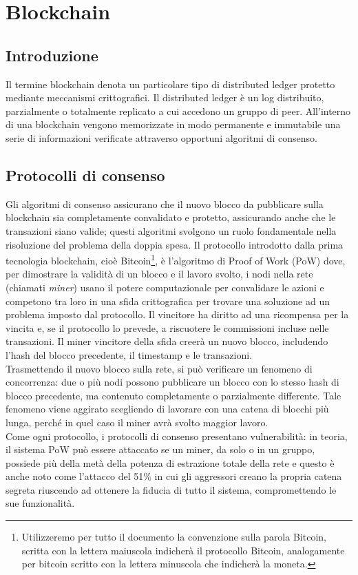 \chapter{Blockchain}
\label{chap:blockchain}

\section{Introduzione}
\label{sec:introduzione}

Il termine blockchain denota un particolare tipo di distributed ledger protetto mediante meccanismi crittografici.
Il distributed ledger è un log distribuito, parzialmente o totalmente replicato a cui accedono un gruppo di peer.
All’interno di una blockchain vengono memorizzate in modo permanente e immutabile una serie di informazioni verificate attraverso opportuni algoritmi di consenso.


\section{Protocolli di consenso}
\label{sec:protocolloDiConsenso}

Gli algoritmi di consenso assicurano che il nuovo blocco da pubblicare sulla blockchain sia completamente convalidato e protetto, assicurando anche che le transazioni siano valide; questi algoritmi svolgono un ruolo fondamentale nella risoluzione del problema della doppia spesa.
Il protocollo introdotto dalla prima tecnologia blockchain, cioè Bitcoin\footnote{Utilizzeremo per tutto il documento la convenzione sulla parola Bitcoin, scritta con la lettera maiuscola indicherà il protocollo Bitcoin, analogamente per bitcoin scritto con la lettera minuscola che indicherà la moneta.}, è l’algoritmo di  Proof of Work (PoW) dove, per dimostrare la validità di un blocco e il lavoro svolto, i nodi nella rete (chiamati {\it miner\/}) usano il potere computazionale per convalidare le azioni e competono tra loro in una sfida crittografica per trovare una soluzione ad un problema imposto dal protocollo.
Il vincitore ha diritto ad una ricompensa per la vincita e, se il protocollo lo prevede, a riscuotere le commissioni incluse nelle transazioni.
Il miner vincitore della sfida creerà un nuovo blocco, includendo l’hash del blocco precedente, il timestamp e le transazioni. \\
Trasmettendo il nuovo blocco sulla rete, si può verificare un fenomeno di concorrenza: due o più nodi possono pubblicare un blocco con lo stesso hash di blocco precedente, ma contenuto completamente o parzialmente differente. Tale fenomeno viene aggirato scegliendo di lavorare con una catena di blocchi più lunga, perché in quel caso il miner avrà svolto maggior lavoro. \\
Come ogni protocollo, i protocolli di consenso presentano vulnerabilità: in teoria, il sistema PoW può essere attaccato se un miner, da solo o in un gruppo, possiede più della metà della potenza di estrazione totale della rete e questo è anche noto come l'attacco del 51\% in cui gli aggressori creano la propria catena segreta riuscendo ad ottenere la fiducia di tutto il sistema, compromettendo le sue funzionalità.



